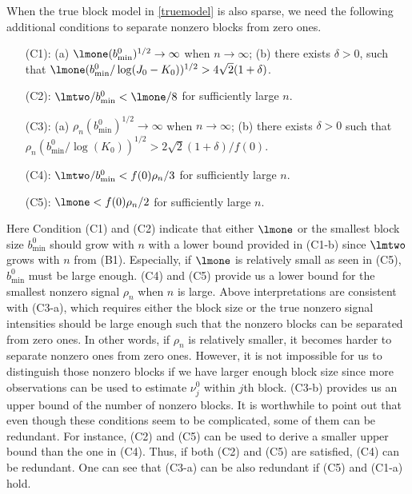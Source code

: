 \documentclass[12pt]{article}
\begin{document}
When the true block model in \eqref{truemodel} is also sparse,
we need the following additional  conditions
to separate nonzero blocks from zero ones.
\begin{itemize}
\item[(C1):]  (a) $\lmone (b_{\min}^0)^{1/2}\to \infty$ when $n\to \infty$;
     (b) there exists $\delta>0$, such that $\lmone(b^0_{\min}/\log(J_0-K_0))^{1/2}>4\sqrt{2}(1+\delta)$.
\item [(C2):]    $\lmtwo/b_{\min}^0 <\lmone/8$ for sufficiently large $n$.
\item [(C3):]  (a) $\rho_n(b^0_{\min})^{1/2} \to \infty$ when $n\to \infty$; (b) there exists $\delta>0$
such that $\rho_n (b^0_{\min}/\log(K_0))^{1/2}>2\sqrt{2}(1+\delta)/f(0)$.
\item [(C4):]  $\lmtwo/b^0_{\min}<f(0)\rho_n/3$ for sufficiently large $n$.
\item [(C5):]  $\lmone<f(0)\rho_n/2$ for sufficiently large $n$.
\end{itemize}
Here Condition (C1) and (C2) indicate
 that  either $\lmone$ or the smallest block size $b^0_{\min}$ should
 grow with $n$ with a lower bound
 provided in (C1-b) since
  $\lmtwo$ grows with $n$ from (B1).
  Especially, if  $\lmone$
 is relatively small as seen in (C5), $b^0_{\min}$
  must be large enough.
   (C4) and (C5) provide us  a lower bound
   for the smallest nonzero signal $\rho_n$ when $n$ is  large.
    Above interpretations are consistent with (C3-a), which
    requires either the block size or the true nonzero signal intensities
 should be large enough such that the nonzero blocks can be separated from zero ones.
 In other words,  if $\rho_n$ is relatively smaller, it becomes harder to separate
 nonzero ones from zero ones. However, it is not impossible
 for us to distinguish those nonzero blocks if we have larger enough block size
   since more observations can be used to
estimate $\nu_j^0$ within $j$th block.
   (C3-b)  provides us an upper bound of the number of nonzero blocks.
  It is worthwhile to point out that even though these conditions
  seem to be complicated, some of them
  can be redundant. For instance,
  (C2) and (C5) can be used to derive a smaller upper bound than the one in (C4). Thus, if both (C2) and (C5)
 are satisfied, (C4) can be redundant.
 One can see that (C3-a) can be also redundant if (C5) and (C1-a) hold.
\end{document}
